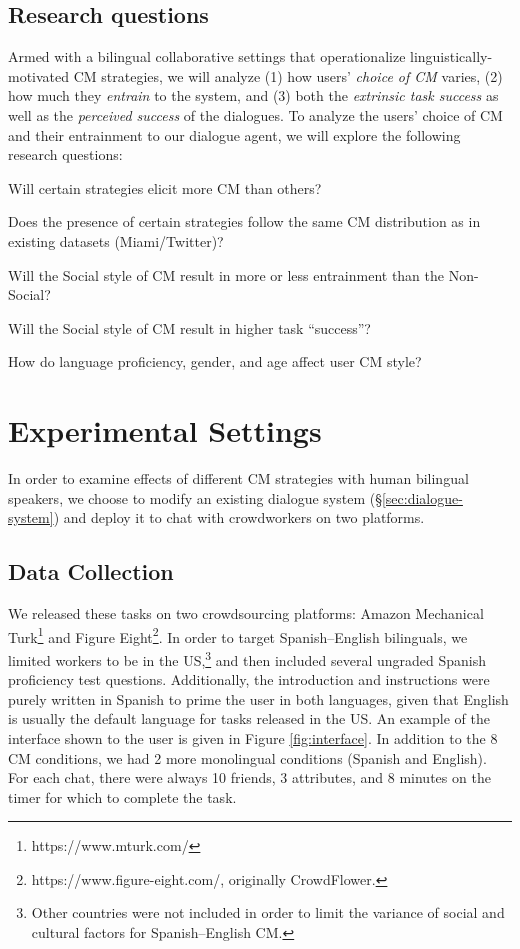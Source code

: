 \documentclass[11pt,a4paper]{article}
\newcommand{\ea}[1]{\textcolor{blue}{\bf\small [#1 --EA]}}
\newcommand{\Sref}[1]{\S\ref{#1}}
\newenvironment{itemizesquish}{\begin{list}{\labelitemi}{\setlength{\itemsep}{-0.25em}\setlength{\labelwidth}{0.5em}\setlength
{\leftmargin}{\labelwidth}\addtolength{\leftmargin}{\labelsep}}}{\end{list}}
\begin{document}
\subsection{Research questions}
Armed with a bilingual collaborative settings that operationalize 
linguistically-motivated CM strategies, 
we will analyze (1) how users' \emph{choice of CM} varies, 
(2) how much they \emph{entrain} to the system, 
and (3) both the \emph{extrinsic task success} as well as the \emph{perceived success} of the dialogues.
To analyze the users' choice of CM and their entrainment to our 
dialogue agent, we will explore the following research 
questions:  
\begin{itemizesquish}
\item Will certain strategies elicit more CM than others?
\item Does the presence of certain strategies follow the same CM distribution as in existing datasets (Miami/Twitter)?
\item Will the Social style of CM result in more or less entrainment than the Non-Social?
\item Will the Social style of CM result in higher task ``success''?
\item How do language proficiency, gender, and age affect user CM style?
\end{itemizesquish}


\section{Experimental Settings}
\label{sec:experiment}
In order to examine effects of different CM strategies with  human bilingual speakers, we choose to modify an existing dialogue system (\Sref{sec:dialogue-system}) and deploy it to chat with crowdworkers on two platforms.

\subsection{Data Collection}

We released these tasks on two crowdsourcing platforms: Amazon Mechanical Turk\footnote{https://www.mturk.com/} and Figure Eight\footnote{https://www.figure-eight.com/, originally CrowdFlower.}. 
In order to target Spanish--English bilinguals, we limited workers to be in the US,\footnote{Other countries were not included in order to limit the variance of social and cultural factors for Spanish--English CM.} and then included several ungraded Spanish proficiency test questions. 
Additionally, the introduction and instructions were purely written in Spanish to prime the user in both languages, given that English is usually the default language for tasks released in the US. 
An example of the interface shown to the user is given in Figure \ref{fig:interface}. 
In addition to the 8 CM conditions, we had 2 more monolingual conditions (Spanish and English).
For each chat, there were always 10 friends, 3 attributes, and 8 minutes on the timer for which to complete the task.
\end{document}
